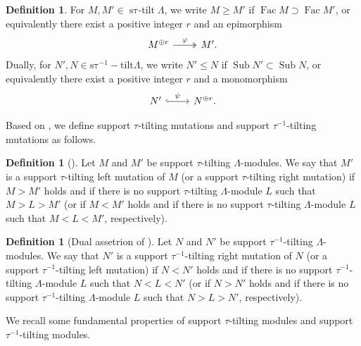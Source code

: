 \documentclass[pdftex,a4paper]{article}
\numberwithin{equation}{subsection}
\theoremstyle{definition}
\newtheorem{definition}[theorem]{Definition}
\newcommand{\stautilt}{\operatorname{\mathrm{s\tau-tilt}}}
\newcommand{\stauitilt}{\operatorname{\mathrm{s\tau^{-1}-tilt}}}
\newcommand{\Fac}{\operatorname{\mathrm{Fac}}}
\newcommand{\Sub}{\operatorname{\mathrm{Sub}}}
\begin{document}
\begin{definition}
	For \(M, M' \in \stautilt \Lambda\), we write \(M\geq M'\) if \(\Fac M\supset \Fac M'\), or equivalently there exist a positive integer \(r\) and an epimorphism
	\begin{equation}
		\begin{tikzcd}
			M^{\oplus r}\ar[r,twoheadrightarrow,"\varphi"]& M'.
		\end{tikzcd}
	\end{equation}
	Dually, for \(N', N \in \stauitilt \Lambda\), we write \(N'\leq N\) if \(\Sub N' \subset \Sub N\), or equivalently there exist a positive integer \(r\) and a monomorphism
	\begin{equation}
		\begin{tikzcd}
			N' \ar[r,hookrightarrow,"\psi"]& N^{\oplus r}.
		\end{tikzcd}
	\end{equation}
\end{definition}

Based on \cite[Theorem 2.33]{MR3187626}, we define support \(\tau\)-tilting mutations and support \(\tau^{-1}\)-tilting mutations as follows.

\begin{definition}[{\cite[Theorem 2.33]{MR3187626}}]
	Let \(M\) and \(M'\) be support \(\tau\)-tilting \(\Lambda\)-modules. We say that
	\(M'\) is a support \(\tau\)-tilting left mutation of \(M\) (or a support \(\tau\)-tilting right mutation) if \(M > M'\) holds and if there is no support \(\tau\)-tilting \(\Lambda\)-module \(L\) such that \(M>L>M'\) (or if \(M < M'\) holds and if there is no support \(\tau\)-tilting \(\Lambda\)-module \(L\) such that \(M<L<M'\), respectively).
\end{definition}

\begin{definition}[{Dual assetrion of \cite[Theorem 2.33]{MR3187626}}]
	Let \(N\) and \(N'\) be support \(\tau^{-1}\)-tilting \(\Lambda\)-modules. We say that
	\(N'\) is a support \(\tau^{-1}\)-tilting right mutation of \(N\) (or a support \(\tau^{-1}\)-tilting left mutation) if \(N < N'\) holds and if there is no support \(\tau^{-1}\)-tilting \(\Lambda\)-module \(L\) such that \(N<L<N'\) (or if \(N > N'\) holds and if there is no support \(\tau^{-1}\)-tilting \(\Lambda\)-module \(L\) such that \(N>L>N'\), respectively).
\end{definition}

We recall some fundamental properties of support \(\tau\)-tilting modules and support \(\tau^{-1}\)-tilting modules.
\end{document}
